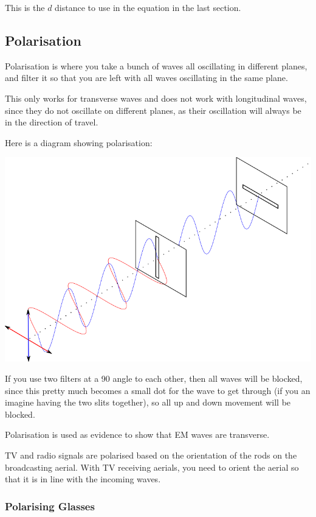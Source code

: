 \documentclass[a4paper, 12pt]{article}
\begin{document}
This is the $d$ distance to use in the equation in the last section.

\subsection{Polarisation}

Polarisation is where you take a bunch of waves all oscillating in different planes, and filter it so that you are left with all waves oscillating in the same plane.

This only works for transverse waves and does not work with longitudinal waves, since they do not oscillate on different planes, as their oscillation will always be in the direction of travel.

Here is a diagram showing polarisation:

\begin{center}
\includegraphics[width=\textwidth]{images/polarisation.png}
\end{center}

If you use two filters at a 90{\textdegree} angle to each other, then all waves will be blocked, since this pretty much becomes a small dot for the wave to get through (if you an imagine having the two slits together), so all up and down movement will be blocked.

Polarisation is used as evidence to show that EM waves are transverse.

TV and radio signals are polarised based on the orientation of the rods on the broadcasting aerial. With TV receiving aerials, you need to orient the aerial so that it is in line with the incoming waves.

\subsubsection{Polarising Glasses}
\end{document}
